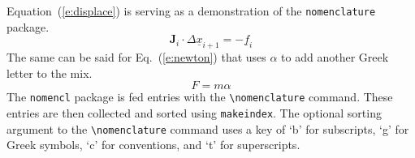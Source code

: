 \documentclass[]{aiaa-tc}%
\newcommand{\eqnref}[1]{(\ref{#1})}
\newcommand{\package}[1]{\texttt{#1}}
\begin{document}
Equation~\eqnref{e:displace} is serving as a demonstration of the
\package{nomenclature} package.
\begin{equation}
  \label{e:displace}
  \mathbf{J}_i\cdot\Delta\underline{x}_{i+1}=-\underline{f}_i
\end{equation}%
%
%
%
%
%
The same can be said for Eq.~\eqnref{e:newton} that uses $\alpha$ to add
another Greek letter to the mix.
\begin{equation}
  \label{e:newton}
  F=m\alpha
\end{equation}%
%
%
%
The \package{nomencl} package is fed entries with the
\verb|\nomenclature| command.
These entries are then collected and sorted using \verb|makeindex|.
The optional sorting argument to the \verb|\nomenclature| command uses
a key of `b' for subscripts, `g' for Greek symbols, `c' for conventions,
and `t' for superscripts.
\end{document}
